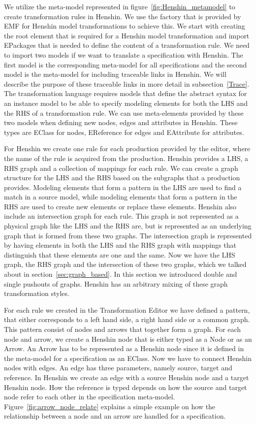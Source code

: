 We utilize the meta-model represented in figure~\ref{fig:Henshin_metamodel} to
create transformation rules in Henshin.  We use the factory that is provided by
EMF for Henshin model transformations to achieve this.
We start with creating the root element that is required for a Henshin model
transformation and import EPackages that is needed to define the content of a
transformation rule. We need to import two models if we want to translate a
specification with Henshin. The first model is the corresponding meta-model for
all specifications and the second model is the meta-model for including
traceable links in Henshin. We will describe the purpose of these traceable
links in more detail in subsection~\ref{Trace}. The transformation language
requires models that define the abstract syntax for an instance model to be
able to specify modeling elements for both the LHS and the RHS of a
transformation rule. We can use meta-elements provided by these two models when
defining new nodes, edges and attributes in Henshin. These types are EClass for
nodes, EReference for edges and EAttribute for attributes. 

For Henshin we create one rule for each production provided by the editor, where
the name of the rule is acquired from the production. Henshin
provides a LHS, a RHS graph and a collection of mappings for each rule. We can
create a graph structure for the LHS and the RHS based on the subgraphs that a
production provides. Modeling elements that form a pattern in the LHS are used
to find a match in a source model, while modeling elements that form a pattern
in the RHS are used to create new elements or replace these elements. Henshin
also include an intersection graph for each rule. This graph is not represented
as a physical graph like the LHS and the RHS are, but is represented as an
underlying graph that is formed from these two graphs. The intersection graph is
represented by having elements in both the LHS and the RHS graph with mappings
that distinguish that these elements are one and the same. Now we have the LHS
graph, the RHS graph and the intersection of these two graphs, which we talked
about in section~\ref{sec:graph_based}. In this section we introduced double
and single pushouts of graphs. Henshin has an arbitrary mixing of these graph
transformation styles.

For each rule we created in the Transformation Editor we have defined a
pattern, that either corresponds to a left hand side, a right hand side or a
common graph. This pattern consist of nodes and arrows that together form a
graph. For each node and arrow, we create a Henshin node that is either typed
as a Node or as an Arrow. An Arrow has to be represented as a Henshin node since
it is defined in the meta-model for a specification as an EClass. Now we have to
connect Henshin nodes with edges. An edge has three parameters, namely source,
target and reference. In Henshin we create an edge with a source Henshin node
and a target Henshin node. How the reference is typed depends on how the
source and target node refer to each other in the specification meta-model.
Figure~\ref{fig:arrow_node_relate} explains a simple example on how
the relationship between a node and an arrow are handled for a specification.

